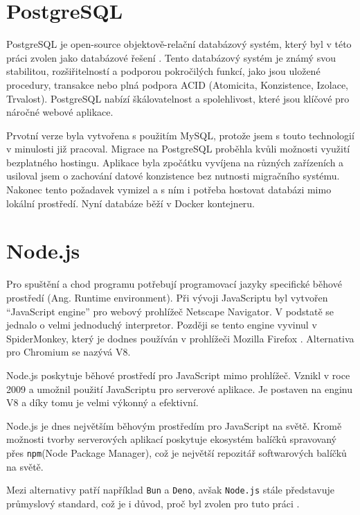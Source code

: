 \section{PostgreSQL}
PostgreSQL je open-source objektově-relační databázový systém, který byl v této práci zvolen jako databázové řešení \cite{postgresqlPostgreSQL}. Tento databázový systém je známý svou stabilitou, rozšiřitelností a podporou pokročilých funkcí, jako jsou uložené procedury, transakce nebo plná podpora ACID (Atomicita, Konzistence, Izolace, Trvalost). PostgreSQL nabízí škálovatelnost a spolehlivost, které jsou klíčové pro náročné webové aplikace.

Prvotní verze byla vytvořena s použitím MySQL, protože jsem s touto technologií v minulosti již pracoval. Migrace na PostgreSQL proběhla kvůli možnosti využití bezplatného hostingu. Aplikace byla zpočátku vyvíjena na různých zařízeních a usiloval jsem o zachování datové konzistence bez nutnosti migračního systému. Nakonec tento požadavek vymizel a s ním i potřeba hostovat databázi mimo lokální prostředí. Nyní databáze běží v Docker kontejneru.

\section{Node.js}
Pro spuštění a chod programu potřebují programovací jazyky specifické běhové prostředí (Ang. Runtime environment)\cite{enwiki:1245152116, alfred2007compilers}. Při vývoji JavaScriptu byl vytvořen ``JavaScript engine'' pro webový prohlížeč Netscape Navigator. V podstatě se jednalo o velmi jednoduchý interpretor. Později se tento engine vyvinul v SpiderMonkey, který je dodnes používán v prohlížeči Mozilla Firefox \cite{newJavaScriptEngineModuleOwner}. Alternativa pro Chromium se nazývá V8\cite{v8JavaScriptEngine}.

Node.js poskytuje běhové prostředí pro JavaScript mimo prohlížeč. Vznikl v roce 2009 a umožnil použití JavaScriptu pro serverové aplikace. Je postaven na enginu V8 a díky tomu je velmi výkonný a efektivní.\cite{nodejsNodejsAbout}

Node.js je dnes největším běhovým prostředím pro JavaScript na světě. Kromě možnosti tvorby serverových aplikací poskytuje ekosystém balíčků spravovaný přes \texttt{npm}(Node Package Manager), což je největší repozitář softwarových balíčků na světě.\cite{npmjsAboutDocs}

Mezi alternativy patří například \texttt{Bun} a \texttt{Deno}, avšak \texttt{Node.js} stále představuje průmyslový standard, což je i důvod, proč byl zvolen pro tuto práci \cite{chhetri2016comparative}.

